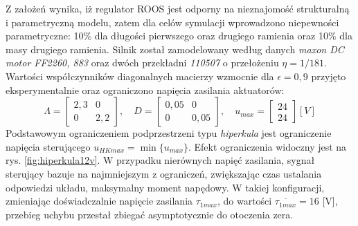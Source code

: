 \documentclass[12pt, a4paper, polish]{article}
\begin{document}
	Z założeń wynika, iż regulator ROOS jest odporny na nieznajomość strukturalną i parametryczną modelu, zatem dla celów symulacji wprowadzono niepewności parametryczne: 10\% dla długości pierwszego oraz drugiego ramienia oraz 10\% dla masy drugiego ramienia. Silnik został zamodelowany według danych \textit{maxon DC motor FF2260, 883} oraz dwóch przekładni \textit{110507} o przełożeniu $\eta=1/181$. Wartości współczynników diagonalnych macierzy wzmocnie dla $\epsilon=0,9$ przyjęto eksperymentalnie oraz ograniczono napięcia zasilania aktuatorów:
	\begin{equation}\label{eqn:regulatory}
	\Lambda=\begin{bmatrix} 2,3 & 0 \\0 & 2,2 \end{bmatrix}, \quad  
	D=\begin{bmatrix} 0,05 & 0 \\0 & 0,05 \end{bmatrix}, \quad 
	u_{max}=\begin{bmatrix}24 \\ 24 \end{bmatrix}[V]
		\end{equation}
	Podstawowym ograniczeniem podprzestrzeni typu \textit{hiperkula} jest ograniczenie napięcia sterującego $u_{HKmax}=\min\{u_{max}\}$. Efekt ograniczenia widoczny jest na rys. \ref{fig:hiperkula12v}. W przypadku nierównych napięć zasilania, sygnał sterujący bazuje na najmniejszym z ograniczeń, zwiększając czas ustalania odpowiedzi układu, maksymalny moment napędowy. W takiej konfiguracji, zmieniając doświadczalnie napięcie zasilania $\tau_{1max}$, do wartości $\overline{\tau_{1max}}= 16$ [V], przebieg uchybu przestał zbiegać asymptotycznie do otoczenia zera. 
\end{document}
